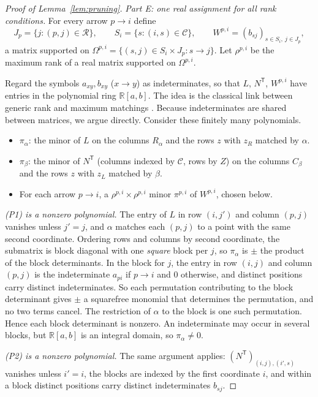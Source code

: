 \documentclass[11pt]{article}
\theoremstyle{remark}
\newcommand{\R}{\mathbb R}
\begin{document}
\begin{proof}[Proof of Lemma~\ref{lem:pruning}]
\medskip\noindent
\emph{Part E: one real assignment for all rank conditions.}
For every arrow $p\to i$ define
\[
 J_p=\{j:(p,j)\in\mathcal R\},\qquad
 S_i=\{s:(i,s)\in\mathcal C\},\qquad
 W^{p,i}=(b_{sj})_{s\in S_i,\ j\in J_p},
\]
a matrix supported on
$\Omega^{p,i}=\{(s,j)\in S_i\times J_p:s\to j\}$.  Let $\rho^{p,i}$ be the
maximum rank of a real matrix supported on $\Omega^{p,i}$.

Regard the symbols $a_{xy},b_{xy}$ ($x\to y$) as indeterminates, so that
$L$, $N^{\mathsf T}$, $W^{p,i}$ have entries in the polynomial ring
$\R[a,b]$.  The idea is the classical link between generic rank and maximum
matchings \cite[Section~5, Theorem~1]{Edmonds1967}.  Because indeterminates
are shared between matrices, we argue directly.  Consider these finitely
many polynomials.
\begin{itemize}[leftmargin=*]
\item[(P1)] $\pi_\alpha$: the minor of $L$ on the columns $R_\alpha$ and the
rows $z$ with $z_R$ matched by $\alpha$.
\item[(P2)] $\pi_\beta$: the minor of $N^{\mathsf T}$ (columns indexed by
$\mathcal C$, rows by $Z$) on the columns $C_\beta$ and the rows $z$ with
$z_L$ matched by $\beta$.
\item[(P3)] For each arrow $p\to i$, a $\rho^{p,i}\times\rho^{p,i}$ minor
$\pi^{p,i}$ of $W^{p,i}$, chosen below.
\end{itemize}

\emph{(P1) is a nonzero polynomial.}  The entry of $L$ in row $(i,j')$ and
column $(p,j)$ vanishes unless $j'=j$, and $\alpha$ matches each $(p,j)$ to
a point with the same second coordinate.  Ordering rows and columns by
second coordinate, the submatrix is block diagonal with one \emph{square}
block per $j$, so $\pi_\alpha$ is $\pm$ the product of the block
determinants.  In the block for $j$, the entry in row $(i,j)$ and column
$(p,j)$ is the indeterminate $a_{pi}$ if $p\to i$ and $0$ otherwise, and
distinct positions carry distinct indeterminates.  So each permutation
contributing to the block determinant gives $\pm$ a squarefree monomial
that determines the permutation, and no two terms cancel.  The restriction
of $\alpha$ to the block is one such permutation.  Hence each block
determinant is nonzero.  An indeterminate may occur in several blocks, but
$\R[a,b]$ is an integral domain, so $\pi_\alpha\ne0$.

\emph{(P2) is a nonzero polynomial.}  The same argument applies:
$(N^{\mathsf T})_{(i,j),(i',s)}$ vanishes unless $i'=i$, the blocks are
indexed by the first coordinate $i$, and within a block distinct positions
carry distinct indeterminates $b_{sj}$.


\end{proof}
\end{document}
